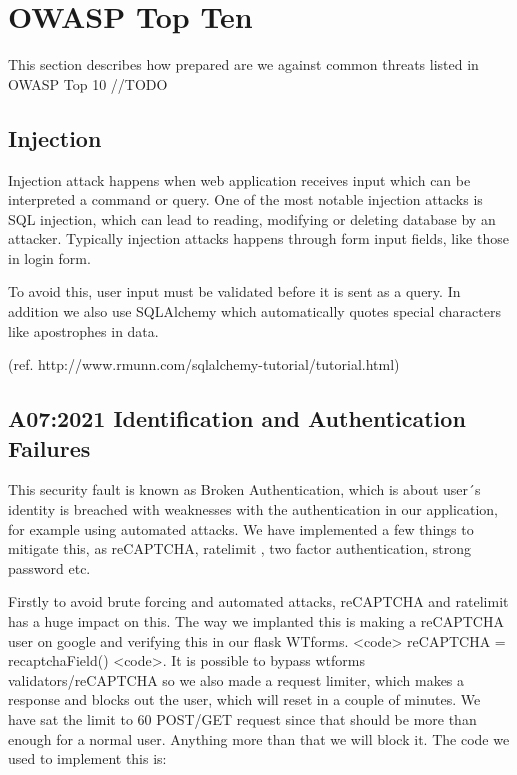 
\chapter{OWASP Top Ten
}\label{kap:owasptopten}

This section describes how prepared are we against common threats listed in OWASP Top 10 //TODO


\section{Injection}

Injection attack happens when web application receives input which can be interpreted a command or query. One of the most notable injection attacks is SQL injection, which can lead to reading, modifying or deleting database by an attacker. Typically injection attacks happens through form input fields, like those in login form.

To avoid this, user input must be validated before it is sent as a query. In addition we also use SQLAlchemy which automatically quotes special characters like apostrophes in data.

(ref. http://www.rmunn.com/sqlalchemy-tutorial/tutorial.html) %

\section{A07:2021 Identification and Authentication Failures}

This security fault is known as Broken Authentication, which is about user´s identity is breached with weaknesses with the authentication in our application, for example using automated attacks. We have implemented a few things to mitigate this, as reCAPTCHA, ratelimit , two factor authentication, strong password etc.   

Firstly to avoid brute forcing and automated attacks, reCAPTCHA and ratelimit has a huge impact on this. The way we implanted this is making a reCAPTCHA user on google and verifying this in our flask WTforms. <code> reCAPTCHA = recaptchaField() <code>. It is possible to bypass wtforms validators/reCAPTCHA so we also made a request limiter, which makes a response and blocks out the user, which will reset in a couple of minutes. We have sat the limit to 60 POST/GET request since that should be more than enough for a normal user. Anything more than that we will block it. The code we used to implement this is:

